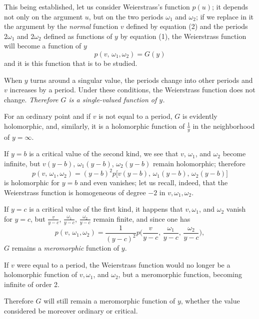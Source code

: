 \documentclass{article}
\begin{document}
This being established, let us consider Weierstrass's function $p(u)$; it depends not only on the argument $u$, but on the two periods $\omega_{1}$ and $\omega_{2}$; if we replace in it the argument by the \emph{normal} function $v$ defined by equation (2) and the periods $2\omega_{1}$ and $2\omega_{2}$ defined as functions of $y$ by equation (1), the Weierstrass function will become a function of $y$
\[
p(v,\, \omega_{1}, \omega_{2}) = G(y)
\]
and it is this function that is to be studied.

When $y$ turns around a singular value, the periods change into other periods and $v$ increases by a period. Under these conditions, the Weierstrass function does not change. \emph{Therefore $G$ is a single-valued function of $y$.}

For an ordinary point and if $v$ is not equal to a period, $G$ is evidently holomorphic, and, similarly, it is a holomorphic function of $\frac{1}{y}$ in the neighborhood of $y = \infty$.

If $y = b$ is a critical value of the second kind, we see that $v$, $\omega_{1}$, and $\omega_{2}$ become infinite, but $v(y - b)$, $\omega_{1}(y - b)$, $\omega_{2}(y - b)$ remain holomorphic; therefore
\[
p(v,\, \omega_{1}, \omega_{2}) = (y - b)^{2} p\bigl[ v(y - b),\, \omega_{1}(y - b),\, \omega_{2}(y - b) \bigr]
\]
is holomorphic for $y = b$ and even vanishes; let us recall, indeed, that the Weierstrass function is homogeneous of degree $-2$ in $v, \omega_{1}, \omega_{2}$.

If $y = c$ is a critical value of the first kind, it happens that $v, \omega_{1}$, and $\omega_{2}$
vanish for $y = c$, but $\frac{v}{y - c}$, $\frac{\omega_{1}}{y - c}$, $\frac{\omega_{2}}{y - c}$ remain finite, and since one has
\[
p(v,\, \omega_{1}, \omega_{2}) = \frac{1}{(y - c)^{2}} p\biggl( \frac{v}{y - c},\, \frac{\omega_{1}}{y - c},\, \frac{\omega_{2}}{y - c} \biggr),
\]
$G$ remains a \emph{meromorphic} function of $y$.

If $v$ were equal to a period, the Weierstrass function would no longer be a holomorphic function of $v, \omega_{1}$, and $\omega_{2}$, but a meromorphic function, becoming infinite of order 2.

Therefore $G$ will still remain a meromorphic function of $y$, whether the value considered be moreover ordinary or critical.
\end{document}
